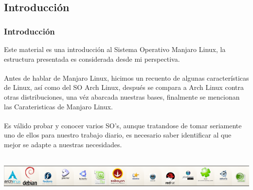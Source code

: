 \documentclass[9pt,t]{beamer}
\begin{document}
\subsection{Introducción}
\begin{frame}\justifying
  \frametitle{Introducción}

    Este material es una introducción al Sistema Operativo Manjaro Linux, la estructura presentada 
    es considerada desde mi perspectiva.
    \ \\ \ \\
    Antes de hablar de Manjaro Linux, hicimos un recuento de algunas características de Linux, 
    así como del SO Arch Linux, después se compara a Arch Linux contra otras distribuciones, 
    una véz abarcada nuestras bases, finalmente se mencionan las Carateristicas de Manjaro Linux. 
    \ \\ \ \\
    Es válido probar y conocer varios SO's, aunque tratandose de tomar seriamente uno de ellos para 
    nuestro trabajo diario, es necesario saber identificar al que mejor se adapte a nuestras necesidades.
	  \ \\ \ \\
    \begin{center}
      \includegraphics[height=0.11\textheight]{images/02_barraDistros.png} \hspace*{0.0cm}
    \end{center}
\end{frame}
\end{document}

